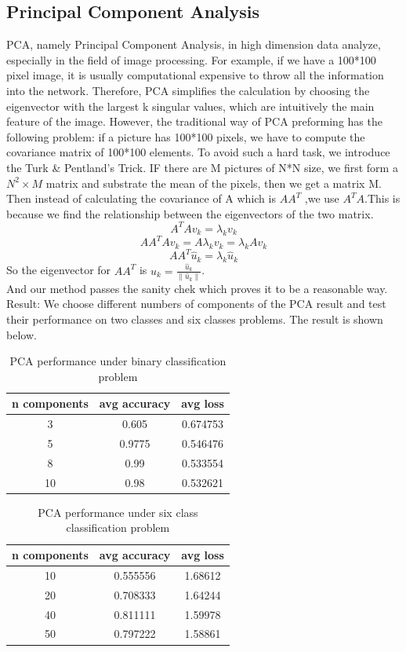 \documentclass{article} %
\begin{document}
\subsection {Principal Component Analysis}
PCA, namely Principal Component Analysis, in high dimension data analyze, especially in the field of image processing. For example, if we have a 100*100 pixel image, it is usually computational expensive to throw all the information into the network. Therefore, PCA simplifies the calculation by choosing the eigenvector with the largest k singular values, which are intuitively the main feature of the image. However, the traditional way of PCA preforming has the following problem: if a picture has 100*100 pixels, we have to compute the covariance matrix of 100*100 elements. To avoid such a hard task, we introduce the Turk \& Pentland’s Trick. IF there are M pictures of N*N size, we first form a  $N^2 \times M$ matrix and substrate the mean of the pixels, then we get a matrix M.
Then instead of calculating the covariance of A which is $AA^T$ ,we use $A^TA$.This is because we find the relationship between the eigenvectors of the two matrix.
$$A^{T} A v_{k}=\lambda_{k} v_{k}$$
$$A A^{T} A v_{k}=A \lambda_{k} v_{k}=\lambda_{k} A v_{k}$$
$$A A^{T} \hat{u}_{k}=\lambda_{k} \hat{u}_{k}$$
So the eigenvector for $A A^{T}$ is $u_{k}=\frac{\hat{u}_{k}}{\left\|\hat{u}_{k}\right\|}$.\\
And our method passes the sanity chek which proves it to be a reasonable way.
Result: We choose different numbers of components of the PCA result and test their performance on two classes and six classes problems. The result is shown below.
\begin{table}[!htbp]
\centering
\begin{tabular}{ccc}
\hline
n components&avg accuracy& avg loss\\
\hline
3& 0.605& 0.674753\\
5& 0.9775& 0.546476\\
8&0.99&0.533554\\
10&0.98& 0.532621\\
\hline
\end{tabular}
\caption{PCA performance under binary classification problem}
\end{table}
\begin{table}[!htbp]
	\centering
	\begin{tabular}{ccc}
		\hline
		n components&avg accuracy& avg loss\\
		\hline
		10& 0.555556& 1.68612 \\
		20& 0.708333& 1.64244\\
		40&0.811111 & 1.59978\\
		50&0.797222 & 1.58861\\
		\hline
	\end{tabular}
	\caption{PCA performance under six class classification problem}
\end{table}
\end{document}
